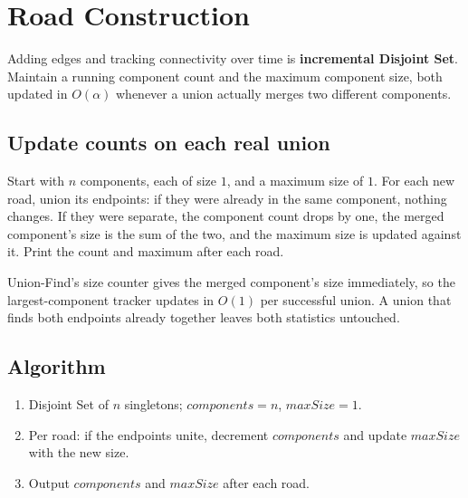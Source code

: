 \section{Road Construction}
\label{sec:cses-road-construction}


\begin{patternbox}
Adding edges and tracking connectivity over time is \textbf{incremental
Disjoint Set}. Maintain a running component count and the maximum component
size, both updated in $O(\alpha)$ whenever a union actually merges two
different components.
\end{patternbox}

\subsection*{Update counts on each real union}

Start with $n$ components, each of size $1$, and a maximum size of $1$.
For each new road, union its endpoints: if they were already in the same
component, nothing changes. If they were separate, the component count
drops by one, the merged component's size is the sum of the two, and the
maximum size is updated against it. Print the count and maximum after each
road.

\begin{ideabox}
Union-Find's size counter gives the merged component's size immediately, so
the largest-component tracker updates in $O(1)$ per successful union. A
union that finds both endpoints already together leaves both statistics
untouched.
\end{ideabox}

\subsection*{Algorithm}

\begin{enumerate}
  \item Disjoint Set of $n$ singletons; $\textit{components}=n$,
        $\textit{maxSize}=1$.
  \item Per road: if the endpoints unite, decrement $\textit{components}$
        and update $\textit{maxSize}$ with the new size.
  \item Output $\textit{components}$ and $\textit{maxSize}$ after each road.
\end{enumerate}

